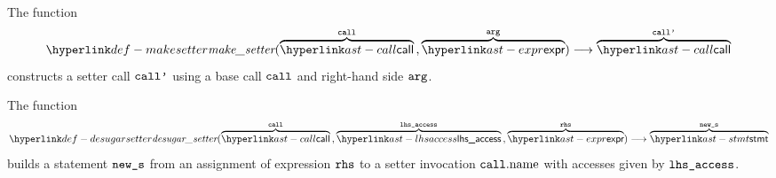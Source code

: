 \hypertarget{def-makesetter}{}
The function
\[
\makesetter(
  \overname{\call}{\vcall} \aslsep
  \overname{\expr}{\varg}) \aslto \overname{\call}{\vcallp}
\]
constructs a setter call $\vcallp$ using a base call $\vcall$ and right-hand side $\varg$.

\begin{mathpar}
\end{mathpar}

\hypertarget{def-desugarsetter}{}
The function
\[
\desugarsetter(
  \overname{\call}{\vcall} \aslsep
  \overname{\lhsaccess}{\vlhsaccess} \aslsep
  \overname{\expr}{\rhs}) \aslto \overname{\stmt}{\news}
\]
builds a statement $\news$ from an assignment of expression $\rhs$ to a setter invocation $\vcall.\callname$ with accesses given by $\vlhsaccess$.

\begin{mathpar}
\end{mathpar}

\begin{mathpar}
\end{mathpar}

